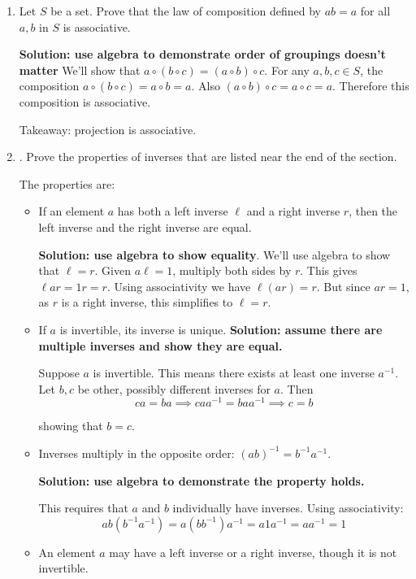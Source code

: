 \documentclass[main.tex]{subfiles}
\begin{document}
\begin{enumerate}
    \item Let $S$ be a set. Prove that the law of composition defined by $ab = a$ for all $a, b$ in $S$ is associative.

    \textbf{Solution: use algebra to demonstrate order of groupings doesn't matter}
    We'll show that $a \circ (b \circ c) = (a \circ b) \circ c$. For any $a, b, c \in S$, the composition $a \circ (b \circ c) = a\circ b = a$. Also $(a \circ b) \circ c = a \circ c = a$. Therefore this composition is associative. 

    Takeaway: projection is associative.

    \item. Prove the properties of inverses that are listed near the end of the section. 
    
    The properties are:
    
    \begin{itemize}
        \item If an element $a$ has both a left inverse $\ell$ and a right inverse $r$, then the left inverse and the right inverse are equal.
        
        \textbf{Solution: use algebra to show equality}. We'll use algebra to show that $\ell = r$. Given $a\ell = 1$, multiply both sides by $r$. This gives $\ell ar = 1r = r$. Using associativity we have $\ell(ar)= r$. But since $ar = 1$, as $r$ is a right inverse, this simplifies to $\ell = r$. 
        \item If $a$ is invertible, its inverse is unique.
        \textbf{Solution: assume there are multiple inverses and show they are equal.}

        Suppose $a$ is invertible. This means there exists at least one inverse $a^{-1}$. Let $b, c$ be other, possibly different inverses for $a$. Then
        $$ca = ba \implies caa^{-1} = baa^{-1} \implies c = b$$

        showing that $b = c$.

        \item Inverses multiply in the opposite order: $(ab)^{-1} = b^{-1}a^{-1}$.
        
        \textbf{Solution: use algebra to demonstrate the property holds.}

        This requires that $a$ and $b$ individually have inverses. Using associativity:
        $$ab(b^{-1}a^{-1}) = a(bb^{-1})a^{-1} = a1a^{-1} = aa^{-1} = 1$$

        \item An element $a$ may have a left inverse or a right inverse, though it is not invertible.
        

\end{itemize}
\end{enumerate}
\end{document}
